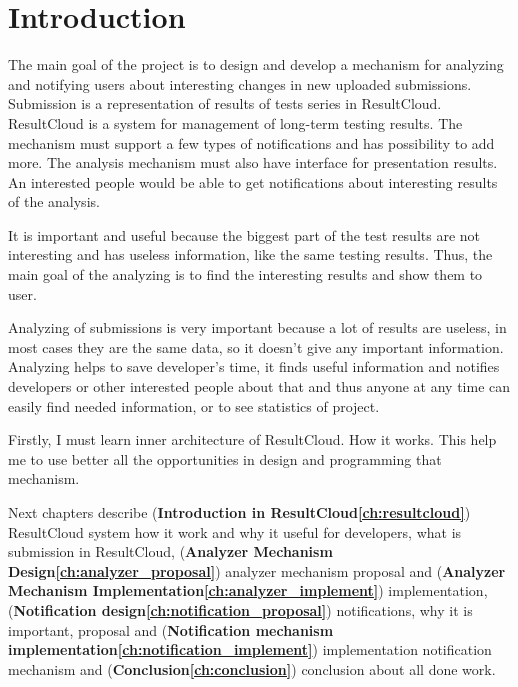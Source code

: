 
\chapter{Introduction}

The main goal of the project is to design and develop a mechanism for analyzing and notifying users about interesting changes in new uploaded submissions. Submission is a representation of results of tests series in ResultCloud. ResultCloud is a system for management of long-term testing results. The mechanism must support a few types of notifications and has possibility to add more. The analysis mechanism must also have interface for presentation results. An interested people would be able to get notifications about interesting results of the analysis.

It is important and useful because the biggest part of the test results are not interesting and has useless information, like the same testing results. Thus, the main goal of the analyzing is to find the interesting results and show them to user.

Analyzing of submissions is very important because a lot of results are useless, in most cases they are the same data, so it doesn't give any important information. Analyzing helps to save developer's time, it finds useful information and notifies developers or other interested people about that and thus anyone at any time can easily find needed information, or to see statistics of project.

Firstly, I must learn inner architecture of ResultCloud. How it works. This help me to use better all the opportunities in design and programming that mechanism.

Next chapters describe (\textbf{Introduction in ResultCloud\ref{ch:resultcloud}}) ResultCloud system how it work and why it useful for developers, what is submission in ResultCloud, (\textbf{Analyzer Mechanism Design\ref{ch:analyzer_proposal}}) analyzer mechanism proposal and (\textbf{Analyzer Mechanism Imple\-me\-nta\-tion\ref{ch:analyzer_implement}}) implementation, (\textbf{Notification design\ref{ch:notification_proposal}}) notifications, why it is important, proposal and (\textbf{Notification mechanism implementation\ref{ch:notification_implement}}) implementation notification mechanism and (\textbf{Conclusion\ref{ch:conclusion}}) conclusion about all done work.


